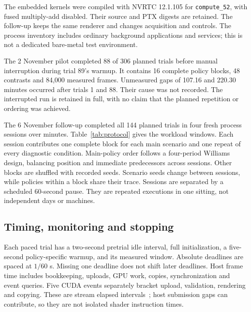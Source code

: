 \documentclass[10pt,conference]{IEEEtran}
\begin{document}
The embedded kernels were compiled with NVRTC 12.1.105 for \texttt{compute\_52}, with fused multiply-add disabled. Their source and PTX digests are retained. The follow-up keeps the same renderer and changes acquisition and controls. The process inventory includes ordinary background applications and services; this is not a dedicated bare-metal test environment.

The 2 November pilot completed 88 of 306 planned trials before manual interruption during trial 89's warmup. It contains 16 complete policy blocks, 48 contrasts and 84,000 measured frames. Unmeasured gaps of 107.16 and 220.30 minutes occurred after trials 1 and 88. Their cause was not recorded. The interrupted run is retained in full, with no claim that the planned repetition or ordering was achieved.

The 6 November follow-up completed all 144 planned trials in four fresh process sessions over \FollowupRuntime{} minutes. Table~\ref{tab:protocol} gives the workload windows. Each session contributes one complete block for each main scenario and one repeat of every diagnostic condition. Main-policy order follows a four-period Williams design, balancing position and immediate predecessors across sessions. Other blocks are shuffled with recorded seeds. Scenario seeds change between sessions, while policies within a block share their trace. Sessions are separated by a scheduled 60-second pause. They are repeated executions in one sitting, not independent days or machines.

\begin{table}[t]
\centering
\caption{Completed follow-up design. Counts include all four sessions. The 48 main trials form 12 four-policy blocks.}
\label{tab:protocol}

\end{table}

\subsection{Timing, monitoring and stopping}
Each paced trial has a two-second pretrial idle interval, full initialization, a five-second policy-specific warmup, and its measured window. Absolute deadlines are spaced at $1/60$ s. Missing one deadline does not shift later deadlines. Host frame time includes bookkeeping, uploads, GPU work, copies, synchronization and event queries. Five CUDA events separately bracket upload, validation, rendering and copying. These are stream elapsed intervals~\cite{events}; host submission gaps can contribute, so they are not isolated shader instruction times.
\end{document}
